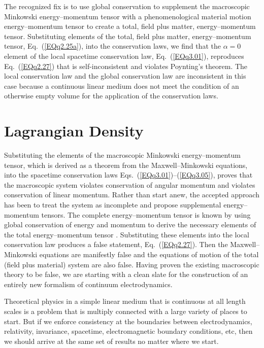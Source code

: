 \documentclass[twocolumn,amssymb,eqsecnum,aps,pra]{revtex4-2}
\begin{document}
The recognized fix is to use global conservation to supplement
the macroscopic Minkowski energy--momentum tensor with a
phenomenological material motion energy--momentum tensor to
create a total, field plus matter, energy--momentum tensor.
Substituting elements of the total, field plus matter, energy--momentum
tensor, Eq.~(\ref{EQq2.25a}), into the conservation laws, we find
that the $\alpha=0$ element of the local spacetime conservation
law, Eq.~(\ref{EQq3.01}), reproduces Eq.~(\ref{EQq2.27}) that is
self-inconsistent and violates Poynting's theorem.
The local conservation law and the global conservation law are
inconsistent in this case because a continuous linear medium does
not meet the condition of an otherwise empty volume for the
application of the conservation laws.
\par
\section{Lagrangian Density}
\par
Substituting the elements of the macroscopic Minkowski energy--momentum
tensor, which is derived as a theorem from the Maxwell--Minkowski
equations, into the spacetime conservation laws
Eqs.~(\ref{EQq3.01})--(\ref{EQq3.05}), proves that the macroscopic
system violates conservation of angular momentum and
violates conservation of linear momentum.
Rather than start anew, the accepted approach has been to treat the
system as incomplete and propose supplemental energy--momentum tensors.
The complete energy--momentum tensor is known by using global
conservation of energy and momentum to derive the necessary elements
of the total energy--momentum tensor \cite{BIPfei,BIJMP,BIOptCommun}.
Substituting these elements into the local conservation law produces
a false statement, Eq.~(\ref{EQq2.27}).
Then the Maxwell--Minkowski equations are manifestly false and the 
equations of motion of the total (field plus material) system are
also false.
Having proven the existing macroscopic theory to be false, we are
starting with a clean slate for the construction of an entirely new
formalism of continuum electrodynamics.
\par
Theoretical physics in a simple linear medium that is continuous
at all length scales is a problem that is multiply connected
with a large variety of places to start.
But if we enforce consistency at the boundaries between
electrodynamics, relativity, invariance, spacetime, electromagnetic
boundary conditions, etc, then we should arrive at the same set of
results no matter where we start.
\end{document}
